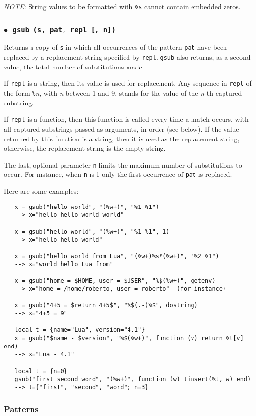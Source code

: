 \documentclass[11pt,twoside,draft]{article}
\makeatletter
\newcommand{\M}[1]{{\rm\emph{#1}}}
\newcommand{\T}[1]{{\tt #1}}
\newcommand{\DefLIB}[1]{\index{#1@{\tt #1}}}
\newcommand{\ff}{$\bullet$\ }
\newcommand{\NOTE}{\par\medskip\noindent\emph{NOTE}: }
\makeatother
\begin{document}
\NOTE
String values to be formatted with
\verb|%s| cannot contain embedded zeros.

\subsubsection*{\ff \T{gsub (s, pat, repl [, n])}}
\DefLIB{gsub}
Returns a copy of \verb|s|
in which all occurrences of the pattern \verb|pat| have been
replaced by a replacement string specified by \verb|repl|.
\verb|gsub| also returns, as a second value,
the total number of substitutions made.

If \verb|repl| is a string, then its value is used for replacement.
Any sequence in \verb|repl| of the form \verb|%|\M{n},
with \M{n} between 1 and 9,
stands for the value of the \M{n}-th captured substring.

If \verb|repl| is a function, then this function is called every time a
match occurs, with all captured substrings passed as arguments,
in order (see below).
If the value returned by this function is a string,
then it is used as the replacement string;
otherwise, the replacement string is the empty string.

The last, optional parameter \verb|n| limits
the maximum number of substitutions to occur.
For instance, when \verb|n| is 1 only the first occurrence of
\verb|pat| is replaced.

Here are some examples:
\begin{verbatim}
   x = gsub("hello world", "(%w+)", "%1 %1")
   --> x="hello hello world world"

   x = gsub("hello world", "(%w+)", "%1 %1", 1)
   --> x="hello hello world"

   x = gsub("hello world from Lua", "(%w+)%s*(%w+)", "%2 %1")
   --> x="world hello Lua from"

   x = gsub("home = $HOME, user = $USER", "%$(%w+)", getenv)
   --> x="home = /home/roberto, user = roberto"  (for instance)

   x = gsub("4+5 = $return 4+5$", "%$(.-)%$", dostring)
   --> x="4+5 = 9"

   local t = {name="Lua", version="4.1"}
   x = gsub("$name - $version", "%$(%w+)", function (v) return %t[v] end)
   --> x="Lua - 4.1"

   local t = {n=0}
   gsub("first second word", "(%w+)", function (w) tinsert(%t, w) end)
   --> t={"first", "second", "word"; n=3}
\end{verbatim}


\subsubsection*{Patterns} \label{pm}
\end{document}
